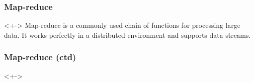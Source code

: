 \begin{frame}
	\frametitle{Map-reduce}
	\begin{block}{}<+->
		Map-reduce is a commonly used chain of functions for processing large data. It works perfectly in a distributed environment and supports data streams.
	\end{block}
\end{frame}


\begin{frame}
	\frametitle{Map-reduce (ctd)}
	\begin{block}{}<+->
		
	\end{block}
\end{frame}


